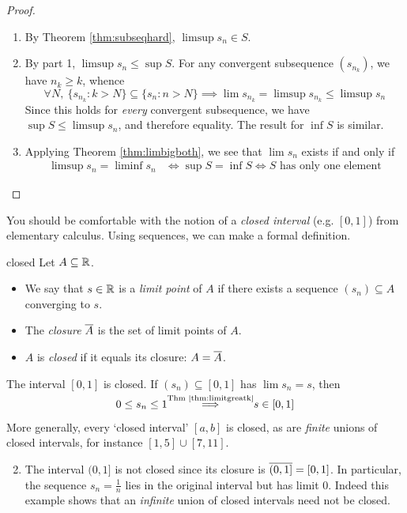 \begin{proof}
\begin{enumerate}
  \item By Theorem \ref{thm:subseqhard}, $\limsup s_n\in S$.
  \item By part 1, $\limsup s_n\le \sup S$. For any convergent subsequence $(s_{n_k})$, we have $n_k\ge k$, whence
	\[\forall N,\ \{s_{n_k}:k>N\}\subseteq\{s_n:n>N\}\implies \lim s_{n_k}=\limsup s_{n_k}\le\limsup s_n\]
	Since this holds for \emph{every} convergent subsequence, we have $\sup S\le\limsup s_n$, and therefore equality. The result for $\inf S$ is similar.
  \item Applying Theorem \ref{thm:limbigboth}, we see that $\lim s_n$ exists if and only if
  \begin{align*}
		\limsup s_n=\liminf s_n&\iff \sup S=\inf S \iff S\text{ has only one element}\tag*{\qedhere}
	\end{align*}
\end{enumerate}
\end{proof}


You should be comfortable with the notion of a \emph{closed interval} (e.g.{} $[0,1]$) from elementary calculus. Using sequences, we can make a formal definition. 

\begin{defn}{}{closed}
	Let $A\subseteq\mathbb{R}$.
	\begin{itemize}
	  \item We say that $s\in\mathbb{R}$ is a \emph{limit point} of $A$ if there exists a sequence $(s_n)\subseteq A$ converging to $s$.
	  \item The \emph{closure} $\overline{A}$ is the set of limit points of $A$.
	  \item $A$ is \emph{closed} if it equals its closure: $A=\overline{A}$.
	\end{itemize}
\end{defn}

\begin{examples}{}{}
	\exstart The interval $[0,1]$ is closed. If $(s_n)\subseteq [0,1]$ has $\lim s_n=s$, then
  \[0\le s_n\le 1 \smash[t]{\overset{\text{Thm \ref{thm:limitgreatk}}}{\implies}} s\in [0,1]\]
  More generally, every `closed interval' $[a,b]$ is closed, as are \emph{finite} unions of closed intervals, for instance $[1,5]\cup[7,11]$.
	\begin{enumerate}\setcounter{enumi}{1}
  	\item The interval $(0,1]$ is not closed since its closure is $\overline{(0,1]}=[0,1]$. In particular, the sequence $s_n=\frac 1n$ lies in the original interval but has limit $0$. Indeed this example shows that an \emph{infinite} union of closed intervals need not be closed.
	\end{enumerate}
\end{examples}


